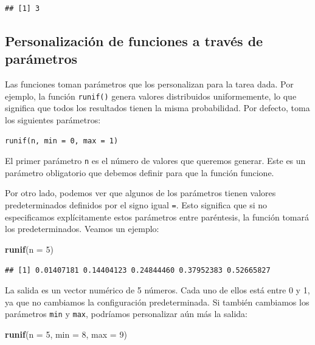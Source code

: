 \documentclass[
]{book}
\newenvironment{Shaded}{\begin{snugshade}}{\end{snugshade}}
\newcommand{\DataTypeTok}[1]{\textcolor[rgb]{0.13,0.29,0.53}{#1}}
\newcommand{\DecValTok}[1]{\textcolor[rgb]{0.00,0.00,0.81}{#1}}
\newcommand{\KeywordTok}[1]{\textcolor[rgb]{0.13,0.29,0.53}{\textbf{#1}}}
\newcommand{\NormalTok}[1]{#1}
\begin{document}
\begin{verbatim}
## [1] 3
\end{verbatim}

\hypertarget{personalizaciuxf3n-de-funciones-a-travuxe9s-de-paruxe1metros}{%
\subsection{Personalización de funciones a través de parámetros}\label{personalizaciuxf3n-de-funciones-a-travuxe9s-de-paruxe1metros}}

Las funciones toman parámetros que los personalizan para la tarea dada. Por ejemplo, la función \texttt{runif()} genera valores distribuidos uniformemente, lo que significa que todos los resultados tienen la misma probabilidad. Por defecto, toma los siguientes parámetros:

\begin{verbatim}
runif(n, min = 0, max = 1)
\end{verbatim}

El primer parámetro \texttt{n} es el número de valores que queremos generar. Este es un parámetro obligatorio que debemos definir para que la función funcione.

Por otro lado, podemos ver que algunos de los parámetros tienen valores predeterminados definidos por el signo igual \texttt{=}. Esto significa que si no especificamos explícitamente estos parámetros entre paréntesis, la función tomará los predeterminados. Veamos un ejemplo:

\begin{Shaded}
\begin{Highlighting}[]
\KeywordTok{runif}\NormalTok{(}\DataTypeTok{n =} \DecValTok{5}\NormalTok{)}
\end{Highlighting}
\end{Shaded}

\begin{verbatim}
## [1] 0.01407181 0.14404123 0.24844460 0.37952383 0.52665827
\end{verbatim}

La salida es un vector numérico de 5 números. Cada uno de ellos está entre 0 y 1, ya que no cambiamos la configuración predeterminada. Si también cambiamos los parámetros \texttt{min} y \texttt{max}, podríamos personalizar aún más la salida:

\begin{Shaded}
\begin{Highlighting}[]
\KeywordTok{runif}\NormalTok{(}\DataTypeTok{n =} \DecValTok{5}\NormalTok{, }\DataTypeTok{min =} \DecValTok{8}\NormalTok{, }\DataTypeTok{max =} \DecValTok{9}\NormalTok{)}
\end{Highlighting}
\end{Shaded}
\end{document}
